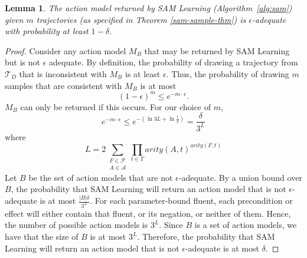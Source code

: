 \documentclass{article}
\newtheorem{lemma}{Lemma}
\newcommand{\liftf}{F}
\newcommand{\lifta}{A}
\begin{document}
\begin{lemma}\label{adequate-lem}
The action model returned by SAM Learning (Algorithm~\ref{alg:sam}) 
given $m$ trajectories (as specified in Theorem \ref{sam-sample-thm})
is $\epsilon$-adequate with probability at least $1-\delta$. 
\end{lemma}
\begin{proof}
Consider any action model $M_B$ that may be returned by SAM Learning but is not $\epsilon$ adequate. 
By definition, the probability of drawing a trajectory from $\mathcal{T}_D$ that is inconsistent with $M_B$ is at least $\epsilon$. Thus, the probability of drawing $m$ samples 
that are consistent with $M_B$ is at most
\begin{equation}
    (1-\epsilon)^{m}\leq e^{-m\cdot\epsilon}.
\end{equation}
$M_B$ can only be returned if this occurs. For our choice of $m$,
\begin{equation}
e^{-m\cdot \epsilon }
\leq e^{-(\ln{3}L + \ln\frac{1}{\delta})} 
= \frac{\delta}{3^L}
\label{eq:singleBadModelProb}
\end{equation}
where 
\[
L=2\sum_{\substack{\liftf\in\mathcal{F}\\\lifta\in\mathcal{A}}}\prod_{t\in T}arity(\lifta,t)^{arity(\liftf,t)}
\]
Let $B$ be the set of action models that are not $\epsilon$-adequate. 
By a union bound over $B$, the probability that SAM Learning will return an action model that is not $\epsilon$-adequate 
is at most $\frac{|B|\delta}{3^L}$.
For each parameter-bound fluent, each precondition or effect will either contain that fluent, or its negation, or neither of them. Hence, the number of possible action models is $3^L$. 
Since $B$ is a set of action models, we have that the size of $B$ is at most $3^{L}$. 
Therefore, the probability that SAM Learning will return an action model that is not $\epsilon$-adequate is at most $\delta$. 
\end{proof}
\end{document}
